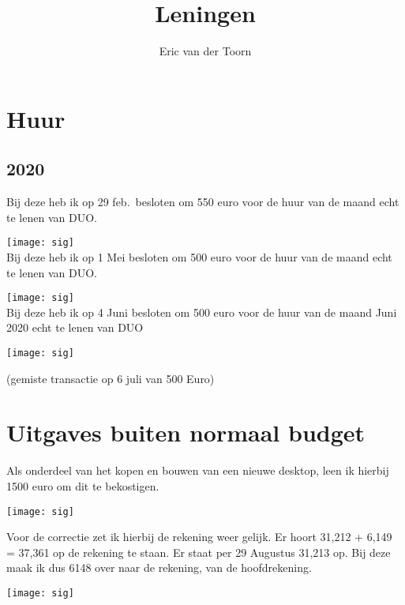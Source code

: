 \documentclass[12pt,a4paper]{article}
\title{Leningen}
\author{Eric van der Toorn}
\newcommand{\sign}{\par \texttt{[image: sig]}}
\begin{document}
\maketitle

\section{Huur}
\subsection{2020}
Bij deze heb ik op 29 feb.\ besloten om 550 euro voor de huur van de maand echt te lenen van DUO.
\sign
\\
Bij deze heb ik op 1 Mei besloten om 500 euro voor de huur van de maand echt te lenen van DUO.
\sign
\\
Bij deze heb ik op 4 Juni besloten om 500 euro voor de huur van de maand Juni 2020 echt te lenen van DUO
\sign

(gemiste transactie op 6 juli van 500 Euro)

\section{Uitgaves buiten normaal budget}

Als onderdeel van het kopen en bouwen van een nieuwe desktop, leen ik hierbij 1500 euro om dit te bekostigen.

\sign%


Voor de correctie zet ik hierbij de rekening weer gelijk. Er hoort 31,212 + 6,149 = 37,361 op de rekening te staan. Er staat per 29 Augustus 31,213 op. Bij deze maak ik dus 6148 over naar de rekening, van de hoofdrekening.

\sign
\end{document}
